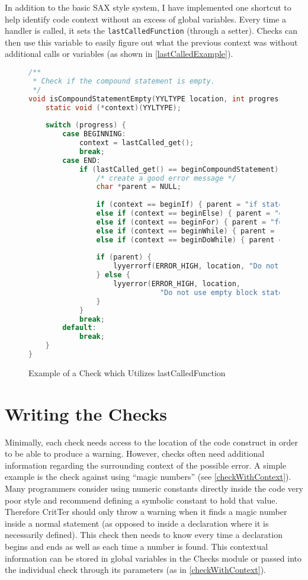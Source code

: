 \documentclass[12pt]{report}
\newcommand{\programName}{CritTer\xspace}
\begin{document}
In addition to the basic SAX style system, I have implemented one shortcut to help identify code context 
without an excess of global variables. Every time a handler is called, it sets the 
\lstinline{lastCalledFunction} (through a setter). Checks can then use this variable to easily figure out 
what the previous context was without additional calls or variables (as shown in 
\autoref{lastCalledExample}).

\begin{figure}
\begin{lstlisting}[language=C]
/**
 * Check if the compound statement is empty.
 */
void isCompoundStatementEmpty(YYLTYPE location, int progress) {
	static void (*context)(YYLTYPE);
	
	switch (progress) {
		case BEGINNING:
			context = lastCalled_get();
			break;
		case END:
			if (lastCalled_get() == beginCompoundStatement) {
				/* create a good error message */
				char *parent = NULL;
				
				if (context == beginIf) { parent = "if statements"; }
				else if (context == beginElse) { parent = "else statements"; }
				else if (context == beginFor) { parent = "for loops"; }
				else if (context == beginWhile) { parent = "while loops"; }
				else if (context == beginDoWhile) { parent = "doWhile loops"; }
				
				if (parent) {
					lyyerrorf(ERROR_HIGH, location, "Do not use empty %s", parent);
				} else {
					lyyerror(ERROR_HIGH, location, 
						       "Do not use empty block statements");
				}
			}
			break;
		default:
			break;
	}
}
\end{lstlisting}
\caption{Example of a Check which Utilizes lastCalledFunction}
\label{lastCalledExample}
\end{figure}
\newpage

\section{Writing the Checks}
\label{writingTheChecks}

Minimally, each check needs access to the location of the code construct in order to be able to produce 
a warning. However, checks often need additional information regarding the surrounding context 
of the possible error. A simple example is the check against using ``magic 
numbers''\cite[p.~19]{practice-of-programming} (see \autoref{checkWithContext}). Many programmers 
consider using numeric constants directly inside the code very poor style and recommend defining a 
symbolic constant to hold that value. Therefore \programName should only throw a warning when it 
finds a magic number inside a normal statement (as opposed to inside a declaration where it is 
necessarily defined). This check then needs to know every time a declaration begins and ends as well 
as each time a number is found. This contextual information can be stored in global variables in the 
Checks module or passed into the individual check through its parameters (as in 
\autoref{checkWithContext}).
\end{document}

